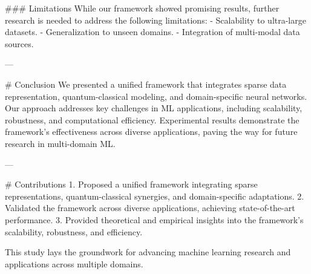 ### Limitations  
While our framework showed promising results, further research is needed to address the following limitations:
- Scalability to ultra-large datasets.
- Generalization to unseen domains.
- Integration of multi-modal data sources.

---

# Conclusion  
We presented a unified framework that integrates sparse data representation, quantum-classical modeling, and domain-specific neural networks. Our approach addresses key challenges in ML applications, including scalability, robustness, and computational efficiency. Experimental results demonstrate the framework's effectiveness across diverse applications, paving the way for future research in multi-domain ML.

---

# Contributions  
1. Proposed a unified framework integrating sparse representations, quantum-classical synergies, and domain-specific adaptations.
2. Validated the framework across diverse applications, achieving state-of-the-art performance.
3. Provided theoretical and empirical insights into the framework's scalability, robustness, and efficiency. 

This study lays the groundwork for advancing machine learning research and applications across multiple domains.